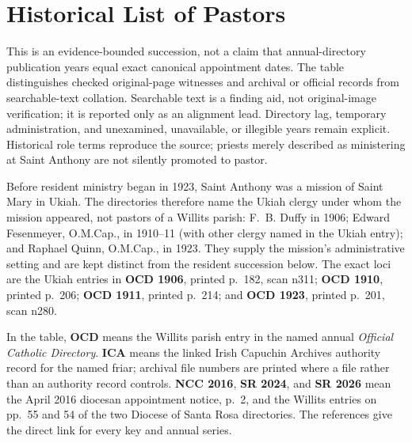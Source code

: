 \section{Historical List of Pastors}

This is an evidence-bounded succession, not a claim that annual-directory
publication years equal exact canonical appointment dates. The table
distinguishes checked original-page witnesses and archival or official records
from searchable-text collation. Searchable text is a finding aid, not
original-image verification; it is reported only as an alignment lead. Directory lag,
temporary administration, and unexamined, unavailable, or illegible years
remain explicit. Historical role terms reproduce the source; priests merely
described as ministering at Saint Anthony are not silently promoted to pastor.

Before resident ministry began in 1923, Saint Anthony was a mission of Saint
Mary in Ukiah. The directories therefore name the Ukiah clergy under whom the
mission appeared, not pastors of a Willits parish: F.~B. Duffy in 1906; Edward
Fesenmeyer, O.M.Cap., in 1910--11 (with other clergy named in the Ukiah entry);
and Raphael Quinn, O.M.Cap., in 1923. They supply the mission's administrative
setting and are kept distinct from the resident succession below. The exact
loci are the Ukiah entries in \textbf{OCD 1906}, printed p.~182, scan n311;
\textbf{OCD 1910}, printed p.~206; \textbf{OCD 1911}, printed p.~214; and
\textbf{OCD 1923}, printed p.~201, scan n280.

In the table, \textbf{OCD} means the Willits parish entry in the named annual
\emph{Official Catholic Directory}. \textbf{ICA} means the linked Irish
Capuchin Archives authority record for the named friar; archival file numbers
are printed where a file rather than an authority record controls. \textbf{NCC
2016}, \textbf{SR 2024}, and \textbf{SR 2026} mean the April 2016 diocesan
appointment notice, p.~2, and the Willits entries on pp.~55 and 54 of the two
Diocese of Santa Rosa directories. The references give the direct link for
every key and annual series.

